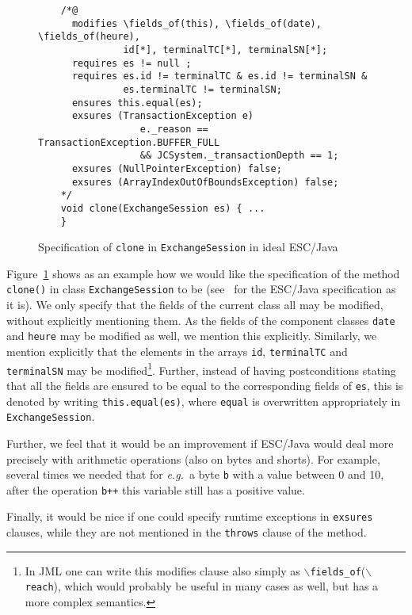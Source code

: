 \documentclass[a4paper]{llncs}
\newcommand{\fieldsof}{\(\backslash\)\texttt{fields\_of}}
\newcommand{\reach}{\(\backslash\)\texttt{reach}}
\begin{document}
\begin{figure}[tbh]
\begin{verbatim}
    /*@
      modifies \fields_of(this), \fields_of(date), \fields_of(heure),
               id[*], terminalTC[*], terminalSN[*];
      requires es != null ;
      requires es.id != terminalTC & es.id != terminalSN &
               es.terminalTC != terminalSN;
      ensures this.equal(es);
      exsures (TransactionException e) 
                  e._reason == TransactionException.BUFFER_FULL 
                  && JCSystem._transactionDepth == 1; 
      exsures (NullPointerException) false;
      exsures (ArrayIndexOutOfBoundsException) false;
    */
    void clone(ExchangeSession es) { ...
    } 
\end{verbatim}
\caption{Specification of \texttt{clone} in \texttt{ExchangeSession}
in ideal ESC/Java}
\label{FigIdealESC}
\end{figure}

Figure~\ref{FigIdealESC} shows as an example how we would like the
specification of the method \texttt{clone()} in class
\texttt{ExchangeSession} to be (see~\cite{CatanoH01Url} for the
ESC/Java specification as it is). We only specify that the fields of
the current class all may be modified, without explicitly mentioning
them. As the fields of the component classes \texttt{date} and
\texttt{heure} may be modified as well, we mention this
explicitly. Similarly, we mention explicitly that the elements in the
arrays \texttt{id}, \texttt{terminalTC} and \texttt{terminalSN} may be
modified\footnote{In JML one can write this modifies clause also
simply as \fieldsof(\reach), which would probably be useful in many
cases as well, but has a more complex semantics.}. Further, instead of
having postconditions stating that all the fields are ensured to be
equal to the corresponding fields of \texttt{es}, this is denoted by
writing \texttt{this.equal(es)}, where \texttt{equal} is overwritten
appropriately in \texttt{ExchangeSession}.

Further, we feel that it would be an improvement if ESC/Java would
deal more precisely with arithmetic operations (also on bytes and
shorts). For example, several times we needed that for \emph{e.g.}~a
byte \texttt{b} with a value between 0 and 10, after the operation
\texttt{b++} this variable still has a positive value. 

Finally, it would be nice if one could specify runtime exceptions in
\texttt{exsures} clauses, while they are not mentioned in the
\texttt{throws} clause of the method.
\end{document}
